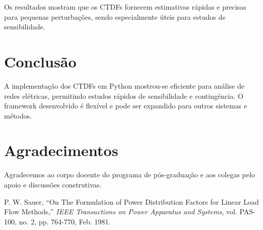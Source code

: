 \documentclass[journal]{IEEEtran}
\begin{document}

Os resultados mostram que os CTDFs fornecem estimativas rápidas e precisas para pequenas perturbações, sendo especialmente úteis para estudos de sensibilidade.

\section{Conclusão}
A implementação dos CTDFs em Python mostrou-se eficiente para análise de redes elétricas, permitindo estudos rápidos de sensibilidade e contingência. O framework desenvolvido é flexível e pode ser expandido para outros sistemas e métodos.

\section*{Agradecimentos}
Agradecemos ao corpo docente do programa de pós-graduação e aos colegas pelo apoio e discussões construtivas.


\begin{thebibliography}{1}
P. W. Sauer, ``On The Formulation of Power Distribution Factors for Linear Load Flow Methods,'' \emph{IEEE Transactions on Power Apparatus and Systems}, vol. PAS-100, no. 2, pp. 764-770, Feb. 1981.
\end{thebibliography}
\end{document}
